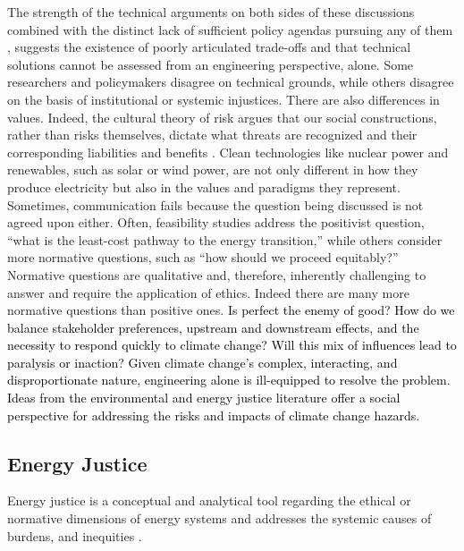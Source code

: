 The strength of the technical arguments on both sides of these discussions
combined with the distinct lack of sufficient policy agendas pursuing any of
them \cite{roelfsema_taking_2020,hale_assessing_2022}, suggests the existence of
poorly articulated trade-offs and that technical solutions cannot be assessed
from an engineering perspective, alone. Some researchers and policymakers
disagree on technical grounds, while others disagree on the basis of
institutional or systemic injustices. There are also differences in values.
Indeed, the cultural theory of risk argues that our social constructions, rather
than risks themselves, dictate what threats are recognized and their
corresponding liabilities and benefits \cite{mcneeley_cultural_2014,
van_de_graaff_understanding_2016}. Clean technologies like nuclear power and
renewables, such as solar or wind power, are not only different in how they
produce electricity but also in the values and paradigms they represent.
Sometimes, communication fails because the question being discussed is not
agreed upon either. Often, feasibility studies address the positivist question,
``what is the least-cost pathway to the energy transition,'' while others
consider more normative questions, such as ``how should we proceed equitably?''
Normative questions are qualitative and, therefore, inherently challenging to
answer and require the application of ethics. Indeed there are many more
normative questions than positive ones. \textcolor{black}{Is perfect the enemy
of good? How do we balance stakeholder preferences, upstream and downstream
effects, and the necessity to respond quickly to climate change? Will this mix
of influences lead to paralysis or inaction?} \textcolor{black}{Given climate
change's complex, interacting, and disproportionate nature, engineering alone is
ill-equipped to resolve the problem. Ideas from the environmental and energy
justice literature offer a social perspective for addressing the risks and
impacts of climate change hazards.}
\subsection{Energy Justice}



Energy justice is a conceptual and analytical tool regarding the ethical or
normative dimensions of energy systems and addresses the systemic causes of
burdens, and inequities \cite{sovacool_energy_2015}. 

